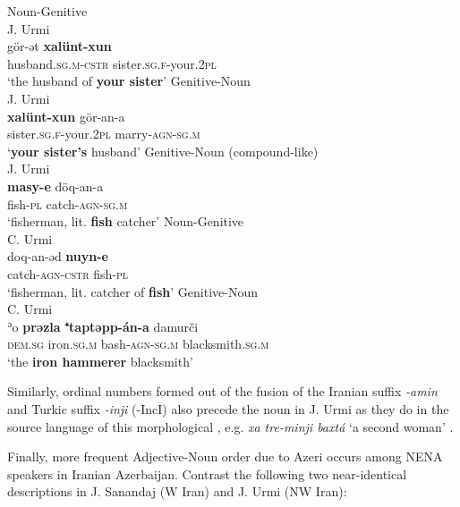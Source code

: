 \documentclass[output=paper,colorlinks,citecolor=brown,draftmode]{langscibook}
\begin{document}
\ea
\ea\label{NAINEI:ex:49a}
Noun-Genitive\\
J. Urmi \citep{Garbell1965b}\\
\gll gör-ət \textbf{xalünt-xun} \\
     husband\textsc{.sg.m-cstr} sister\textsc{.sg.f}-your\textsc{.2pl} \\
\glt `the husband of \textbf{your sister}'
\ex\label{NAINEI:ex:49b}
Genitive-Noun\\
J. Urmi \citep[212]{Garbell1065a} \\
\gll \textbf{xalünt-xun} gör-an-a \\
     sister\textsc{.sg.f}-your\textsc{.2pl} marry\textsc{-agn-sg.m} \\
\glt `\textbf{your sister's} husband'
\ex\label{NAINEI:ex:49c}
Genitive-Noun (compound-like)\\
J. Urmi \citep[86]{Garbell1065a} \\
\gll \textbf{masy-e} döq-an-a \\
     fish\textsc{-pl} catch\textsc{-agn-sg.m} \\
\glt `fisherman, lit. \textbf{fish} catcher' 
\z
\z
\ea
\ea\label{NAINEI:ex:50a}
Noun-Genitive\\
C. Urmi \citep[III:44]{Khan2016CUrmi} \\
\gll doq-an-əd \textbf{nuyn-e} \\
     catch\textsc{-agn-cstr} fish\textsc{-pl} \\
\glt `fisherman, lit. catcher of \textbf{fish}'
\ex\label{NAINEI:ex:50b}
Genitive-Noun\\
C. Urmi \citep[A48:\S 32]{Khan2016CUrmi} \\
\gll ʾo \textbf{prəzla} \textbf{⁺taptəpp-án-a} damurči \\
    \textsc{dem.sg} iron\textsc{.sg.m} bash\textsc{-agn-sg.m} blacksmith\textsc{.sg.m} \\
\glt `the \textbf{iron hammerer} blacksmith'
\z
\z

Similarly, ordinal numbers formed out of the fusion of the Iranian suffix \textit{-amin} and Turkic suffix \textit{-inji} (-IncI)  also precede the noun in J. Urmi as they do in the source language of this morphological , e.g. \textit{xa tre-minji baxtá} `a second woman' \parencite[206]{Garbell1065a}.

Finally, more frequent Adjective-Noun order due to Azeri occurs among NENA speakers in Iranian Azerbaijan. Contrast the following two near-identical  descriptions in J. Sanandaj (W Iran) and J. Urmi (NW Iran):
\end{document}
